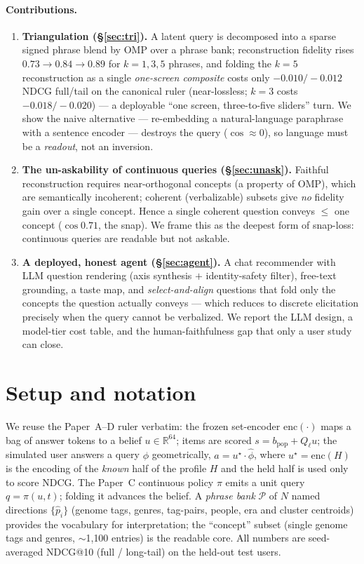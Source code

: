 \documentclass[11pt]{article}
\newcommand{\uk}{u^{\star}}
\begin{document}
\paragraph{Contributions.}
\begin{enumerate}\itemsep2pt
\item \textbf{Triangulation (\S\ref{sec:tri}).} A latent query is decomposed into a sparse signed phrase blend by OMP
over a phrase bank; reconstruction fidelity rises $0.73{\to}0.84{\to}0.89$ for $k{=}1,3,5$ phrases, and folding the
$k{=}5$ reconstruction as a single \emph{one-screen composite} costs only $-0.010/-0.012$ NDCG full/tail on the
canonical ruler (near-lossless; $k{=}3$ costs $-0.018/-0.020$) --- a deployable ``one screen, three-to-five sliders''
turn. We show the naive alternative --- re-embedding a natural-language paraphrase with a sentence encoder --- destroys
the query ($\cos\approx 0$), so language must be a \emph{readout}, not an inversion.
\item \textbf{The un-askability of continuous queries (\S\ref{sec:unask}).} Faithful reconstruction requires
near-orthogonal concepts (a property of OMP), which are semantically incoherent; coherent (verbalizable) subsets give
\emph{no} fidelity gain over a single concept. Hence a single coherent question conveys $\le$ one concept ($\cos
0.71$, the snap). We frame this as the deepest form of snap-loss: continuous queries are readable but not askable.
\item \textbf{A deployed, honest agent (\S\ref{sec:agent}).} A chat recommender with LLM question rendering (axis
synthesis $+$ identity-safety filter), free-text grounding, a taste map, and \emph{select-and-align} questions that
fold only the concepts the question actually conveys --- which reduces to discrete elicitation precisely when the
query cannot be verbalized. We report the LLM design, a model-tier cost table, and the human-faithfulness gap that
only a user study can close.
\end{enumerate}

\section{Setup and notation}\label{sec:setup}
We reuse the Paper~A--D ruler verbatim: the frozen set-encoder $\mathrm{enc}(\cdot)$ maps a bag of answer tokens to a
belief $u\in\mathbb{R}^{64}$; items are scored $s = b_{\mathrm{pop}} + Q_\ell u$; the simulated user answers a query
$\phi$ geometrically, $a=\uk\!\cdot\hat\phi$, where $\uk=\mathrm{enc}(H)$ is the encoding of the \emph{known} half of
the profile $H$ and the held half is used only to score NDCG. The Paper~C continuous policy $\pi$ emits a unit query
$q=\pi(u,t)$; folding it advances the belief. A \emph{phrase bank} $\mathcal{P}$ of $N$ named directions
$\{\hat p_i\}$ (genome tags, genres, tag-pairs, people, era and cluster centroids) provides the vocabulary for
interpretation; the ``concept'' subset (single genome tags and genres, $\sim$1{,}100 entries) is the readable core.
All numbers are seed-averaged NDCG@10 (full / long-tail) on the held-out test users.
\end{document}

